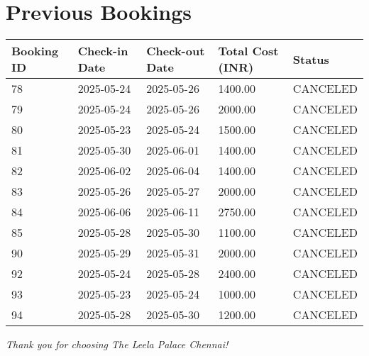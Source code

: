 \documentclass[a4paper,12pt]{article}
\begin{document}
\section*{Previous Bookings}
\begin{tabular}{|l|l|l|l|l|}
\hline
Booking ID & Check-in Date & Check-out Date & Total Cost (INR) & Status \\ 
\hline
78 & 2025-05-24 & 2025-05-26 & 1400.00 & CANCELED \\ 
\hline
79 & 2025-05-24 & 2025-05-26 & 2000.00 & CANCELED \\ 
\hline
80 & 2025-05-23 & 2025-05-24 & 1500.00 & CANCELED \\ 
\hline
81 & 2025-05-30 & 2025-06-01 & 1400.00 & CANCELED \\ 
\hline
82 & 2025-06-02 & 2025-06-04 & 1400.00 & CANCELED \\ 
\hline
83 & 2025-05-26 & 2025-05-27 & 2000.00 & CANCELED \\ 
\hline
84 & 2025-06-06 & 2025-06-11 & 2750.00 & CANCELED \\ 
\hline
85 & 2025-05-28 & 2025-05-30 & 1100.00 & CANCELED \\ 
\hline
90 & 2025-05-29 & 2025-05-31 & 2000.00 & CANCELED \\ 
\hline
92 & 2025-05-24 & 2025-05-28 & 2400.00 & CANCELED \\ 
\hline
93 & 2025-05-23 & 2025-05-24 & 1000.00 & CANCELED \\ 
\hline
94 & 2025-05-28 & 2025-05-30 & 1200.00 & CANCELED \\ 
\hline
\end{tabular}
\vspace{1cm}
\begin{center}
\textit{Thank you for choosing The Leela Palace Chennai!}
\end{center}
\end{document}
